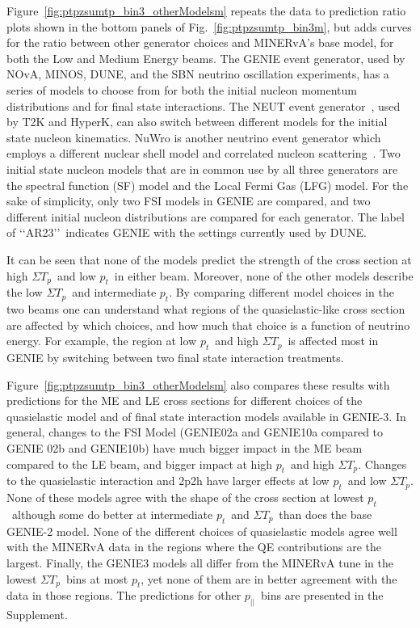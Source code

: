 \documentclass[aps,prl,twocolumn,showpacs,superscriptaddress, floatfix,10pt]{revtex4-2}
\newcommand{\pt}{\ensuremath{p_{t}}}
\newcommand{\pz}{\ensuremath{p_{||}}}
\newcommand{\sumtp}{\ensuremath{\Sigma T_{p}}}
\begin{document}
Figure~\ref{fig:ptpzsumtp_bin3_otherModelsm} repeats the data to prediction ratio plots shown in the bottom panels of Fig.~\ref{fig:ptpzsumtp_bin3m}, but adds curves for the ratio between other generator choices and MINERvA's base model, for both the Low and Medium Energy beams.  The GENIE event generator, used by NOvA, MINOS, DUNE, and the SBN neutrino oscillation experiments, has a series of models to choose from for both the initial nucleon momentum distributions and for final state interactions.  
The NEUT event generator~\cite{Hayato:2009zz}, used by T2K and HyperK, can also switch between different models for the initial state nucleon kinematics.  NuWro is another neutrino event generator which employs a different nuclear shell model and correlated nucleon scattering~\cite{Juszczak:2005zs}.  
Two initial state nucleon models that are in common use by all three generators are the spectral function (SF) model and the Local Fermi Gas (LFG) model.  For the sake of simplicity, only two FSI models in GENIE are compared, and two different initial nucleon distributions are compared for each generator.  The label of \lq\lq AR23\rq\rq\  indicates GENIE with the settings currently used by DUNE.

It can be seen that none of the models predict the strength of the cross section at high \sumtp\ and low \pt\ in either beam.  Moreover, none of the other models describe the low \sumtp\ and intermediate \pt.  
By comparing different model choices in the two beams one can understand what regions of the quasielastic-like cross section are affected by which choices, and how much that choice is a function of neutrino energy.  For example, the region at low \pt\ and high \sumtp\ is affected most in GENIE by switching between two final state interaction treatments.  

Figure~\ref{fig:ptpzsumtp_bin3_otherModelsm} also compares these results with predictions for the ME and LE cross sections for different choices of the quasielastic model and of final state interaction models available in GENIE-3.   In general, changes to the FSI Model (GENIE02a and GENIE10a compared to GENIE 02b and GENIE10b) have much bigger impact in the ME beam compared to the LE beam, and bigger impact at high \pt\ and high \sumtp.  
Changes to the quasielastic interaction and 2p2h have larger effects at low \pt\ and low \sumtp.  None of these models agree with the shape of the cross section at lowest \pt\ although some do better at intermediate \pt\  and \sumtp\ than does the base GENIE-2 model.  
None of the different choices of quasielastic models agree well with the MINERvA data in the regions where the QE contributions are the largest.  Finally, the GENIE3 models all differ from the MINERvA tune in the lowest \sumtp\ bins at most \pt, yet none of them are in better agreement with the data in those regions.  The predictions for other \pz\ bins are presented in the Supplement.  
\end{document}
